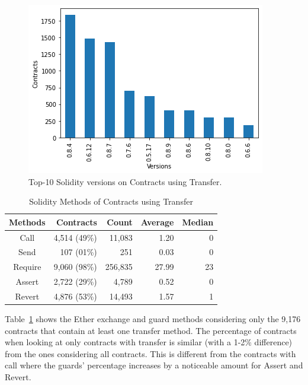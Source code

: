 \documentclass[10pt,conference]{IEEEtran}
\begin{document}
\begin{figure}[h]
  \centering
  \includegraphics[width=\linewidth]{img/transfers_clean_final.png}
  \caption{Top-10 Solidity versions on Contracts using Transfer.}
  \label{fig:transfer_version}
\end{figure}

\begin{table}
\center
  \caption{Solidity Methods of Contracts using Transfer}
  \label{tab:transfer}
  \begin{tabular}{crrrr}
    \hline
    Methods & Contracts & Count & Average & Median \\
    \hline
    Call & 4,514 (49\%) & 11,083 & 1.20 & 0\\
    Send &107 (01\%) & 251 & 0.03 & 0\\
    Require & 9,060 (98\%) &256,835 & 27.99 & 23\\
    Assert & 2,722 (29\%) & 4,789 & 0.52 & 0\\
    Revert & 4,876 (53\%) & 14,493 & 1.57 & 1\\
    \hline
\end{tabular}
\end{table}

Table~\ref{tab:transfer} shows the Ether exchange and guard methods considering only the 9,176 contracts that contain at least one transfer method. The percentage of contracts when looking at only contracts with transfer is similar (with a 1-2\% difference) from the ones considering all contracts. This is different from the contracts with call where the guards' percentage increases by a noticeable amount for Assert and Revert.
\end{document}
